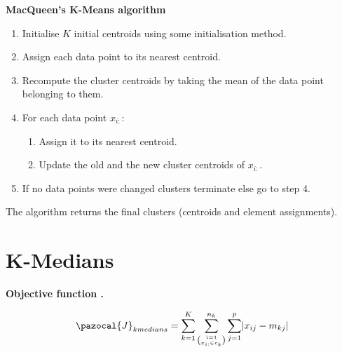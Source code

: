 \documentclass[12pt]{article}
\renewcommand\cite{\citep}  %
\DeclarePairedDelimiter{\abs}{\lvert}{\rvert} %
\newcommand{\CJ}{\pazocal{J}}
\begin{document}
\begin{center}
	\begin{tcolorbox}[breakable,colback=white!100!white,colframe=black!100!black]
		\noindent\textbf{MacQueen's K-Means algorithm}
		\begin{enumerate}
			\item Initialise $K$ initial centroids using some initialisation method. 
			
			\item Assign each data point to its nearest centroid. 
			
			\item Recompute the cluster centroids by taking the mean of the data point belonging to them.
			
			\item For each data point $x_{i:}$:
			
			\begin{enumerate}
				\item Assign it to its nearest centroid.
				\item Update the old and the new cluster centroids of $x_{i:}$.
			\end{enumerate}
			
			\item If no data points were changed clusters terminate else go to step 4.
			
		\end{enumerate}	
		The algorithm returns the final clusters (centroids and element assignments).
	\end{tcolorbox}
\end{center}

\cleardoublepage


\section{K-Medians}

\noindent \textbf{Objective function \cite{aggarwal2014data}.}

\begin{align}\label{kmed1}
\CJ_{kmedians} = \sum_{k=1}^{K}\sum_{\binom{i=1}{x_{i:} \in c_k}}^{n_k} \sum_{j=1}^{p} \abs{x_{ij}-m_{kj}}
\end{align}	
\end{document}
